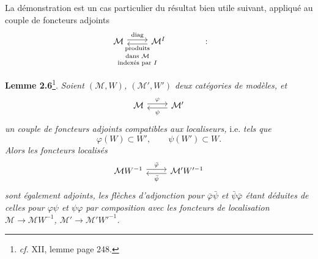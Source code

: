La démonstration est un cas particulier du résultat bien utile suivant, appliqué au couple de foncteurs adjoints
\[
\begin{tikzcd}
\mathcal{M} \arrow[r, shift left, "\mathrm{diag}"] & \mathcal{M}^I \arrow[l, shift left, "\text{\scriptsize\shortstack{produits\\ dans $\mathcal{M}$\\ indexés par $I$}}"]
\end{tikzcd}
\qquad\qquad :
\]

\textbf{Lemme 2.6}\footnote{\textit{cf.} XII, lemme page 248.}. \textit{Soient $(\mathcal{M}, W)$, $(\mathcal{M}', W')$ deux catégories de modèles, et}
\[
\begin{tikzcd}
\mathcal{M} \arrow[r, shift left, "\varphi"] & \mathcal{M}' \arrow[l, shift left, "\psi"]
\end{tikzcd}
\]
\textit{un couple de foncteurs adjoints compatibles aux localiseurs,} i.e. \textit{tels que}
\[
\varphi(W) \subset W', \qquad \psi(W') \subset W.
\]
\textit{Alors les foncteurs localisés}
\[
\begin{tikzcd}
\mathcal{M}W^{-1} \arrow[r, shift left, "\bar{\varphi}"] & \mathcal{M}'W'^{-1} \arrow[l, shift left, "\bar{\psi}"]
\end{tikzcd}
\]
\textit{sont également adjoints, les flèches d'adjonction pour $\bar{\varphi}\bar{\psi}$ et $\bar{\psi}\bar{\varphi}$ étant déduites de celles pour $\varphi\psi$ et $\psi\varphi$ par composition avec les foncteurs de localisation $\mathcal{M} \longrightarrow \mathcal{M}W^{-1}$, $\mathcal{M}' \longrightarrow \mathcal{M}'W'^{-1}$.}

